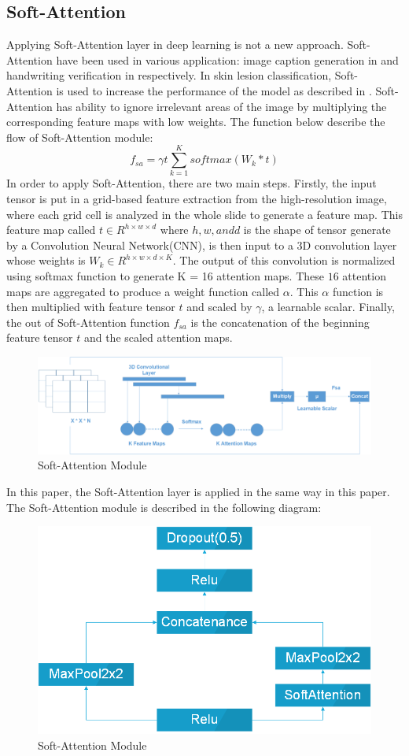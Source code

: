 \subsection{Soft-Attention}
Applying Soft-Attention layer in deep learning is not a new approach. Soft-Attention have been used in various application: image caption generation in \cite{03044} and handwriting verification in \cite{202017} respectively. In skin lesion classification, Soft-Attention is used to increase the performance of the model as described in \cite{03358}. Soft-Attention has ability to ignore irrelevant areas of the image by multiplying the corresponding feature maps with low weights. The function below describe the flow of Soft-Attention module:
\[
	f_{sa} = \gamma t\sum_{k=1}^{K}softmax(W_k * t)
\]
In order to apply Soft-Attention, there are two main steps. Firstly, the input tensor is put in a grid-based feature extraction from the high-resolution image, where each grid cell is analyzed in the whole slide to generate a feature map\cite{08513}. This feature map called $t \in R^{h \times w \times d}$ where $h, w, and d$ is the shape of tensor generate by a Convolution Neural Network(CNN), is then input to a 3D convolution layer whose weights is $W_k \in R^{h \times w \times d \times K}$. The output of this convolution is normalized using softmax function to generate K = 16 attention maps. These $16$ attention maps are aggregated to produce a weight function called $\alpha$. This $\alpha$ function is then multiplied with feature tensor $t$ and scaled by $\gamma$, a learnable scalar. Finally, the out of Soft-Attention function $f_{sa}$ is the concatenation of the beginning feature tensor $t$ and the scaled attention maps. 
\begin{figure}
	\centering
	\includegraphics[width=1\linewidth]{Diagram/SoftAttention}
	\caption{Soft-Attention Module}
	\label{fig:softattention}
\end{figure}
In this paper, the Soft-Attention layer is applied in the same way in this paper\cite{03358}. The Soft-Attention module is described in the following diagram:
\begin{figure}[h]
	\centering
	\includegraphics[width=0.5\linewidth]{Diagram/SoftAttentionBlock}
	\caption{Soft-Attention Module}
	\label{fig:softattentionblock}
\end{figure}\\


